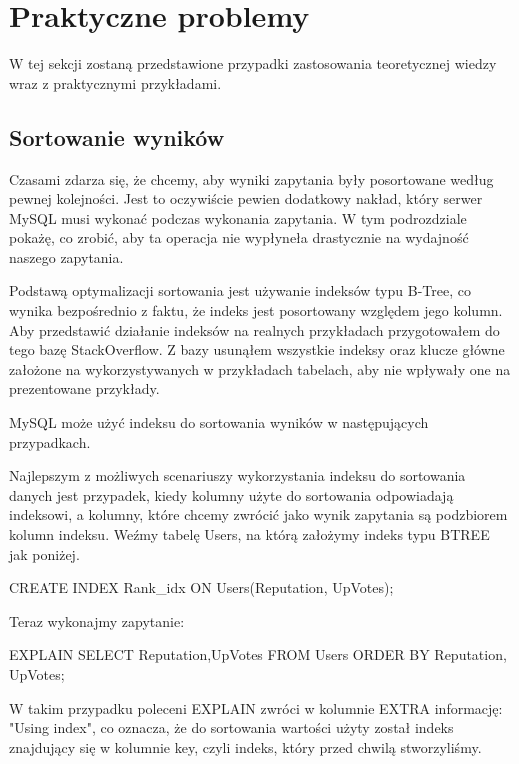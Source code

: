 \section{Praktyczne problemy}
W tej sekcji zostaną przedstawione przypadki zastosowania teoretycznej wiedzy wraz z praktycznymi przykładami.



\subsection{Sortowanie wyników}
Czasami zdarza się, że chcemy, aby wyniki zapytania były posortowane według pewnej kolejności. Jest to oczywiście pewien dodatkowy nakład, który serwer MySQL musi wykonać podczas wykonania zapytania. W tym podrozdziale pokażę, co zrobić, aby ta operacja nie wypłyneła drastycznie na wydajność naszego zapytania.

Podstawą optymalizacji sortowania jest używanie indeksów typu B-Tree, co wynika bezpośrednio z faktu, że indeks jest posortowany względem jego kolumn. Aby przedstawić działanie indeksów na realnych przykładach przygotowałem do tego bazę StackOverflow. Z bazy usunąłem wszystkie indeksy oraz klucze główne założone na wykorzystywanych w przykładach tabelach, aby nie wpływały one na prezentowane przykłady.

MySQL może użyć indeksu do sortowania wyników w następujących przypadkach.



Najlepszym z możliwych scenariuszy wykorzystania indeksu do sortowania danych jest przypadek, kiedy kolumny użyte do sortowania odpowiadają indeksowi, a kolumny, które chcemy zwrócić jako wynik zapytania są podzbiorem kolumn indeksu.
Weźmy tabelę Users, na którą założymy indeks typu BTREE jak poniżej.

\begin{spverbatim}
	CREATE INDEX Rank_idx ON Users(Reputation, UpVotes);
\end{spverbatim}
Teraz wykonajmy zapytanie:
\begin{spverbatim}
	EXPLAIN SELECT Reputation,UpVotes FROM Users ORDER BY Reputation, UpVotes;
\end{spverbatim}
W takim przypadku poleceni EXPLAIN zwróci w kolumnie EXTRA informację: "Using index", co oznacza, że do sortowania wartości użyty został indeks znajdujący się w kolumnie key, czyli indeks, który przed chwilą stworzyliśmy.

